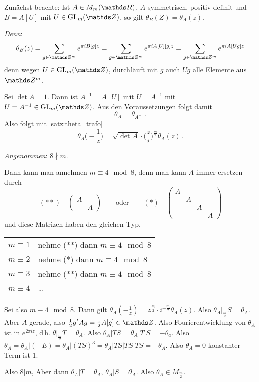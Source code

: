 \begin{bewe}
Zunächst beachte: Ist $A \in M_m(\RR)$, $A$ symmetrisch, positiv definit und $B = A[U]$ mit $U \in \GL_m(\ZZ)$, so gilt $\theta_B(Z) = \theta_A(z)$.

\emph{Denn}:
\[
    \theta_B(z)
    = \sum_{g \in \ZZ^m} e^{\pi iB[g]z}
    = \sum_{g \in \ZZ^m} e^{\pi i A[U][g]z}
    = \sum_{g \in \ZZ^m} e^{\pi i A[Ug]z}
\]
denn wegen $U\in\GL_m(\ZZ)$, durchläuft mit $g$ auch $Ug$ alle Elemente aus $\ZZ^m$.

Sei $\det A = 1$.
Dann ist $A^{-1} = A[U]$ mit $U = A^{-1}$ mit $U = A^{-1} \in \GL_m(\ZZ)$.
Aus den Voraussetzungen folgt damit
\[
    \theta_A = \theta_{A^{-1}}
    \,.
\]
Also folgt mit \autoref{satz:theta_trafo}
\[
    \theta_{A}\Big(-\frac{1}{z}\Big)
    = \sqrt{\det A} \cdot \Big(\frac{z}{i}\Big)^{\frac{m}{2}} \theta_A(z)
    \,.
\]

\emph{Angenommen}: $8 \nmid m$.

Dann kann man annehmen $m \equiv 4 \mod 8$, denn man kann $A$ immer ersetzen durch
\[
    (**)\quad \begin{pmatrix}A&\\&A\end{pmatrix} \qquad \text{oder} \qquad (*) \quad \begin{pmatrix}A\\&A\\&&A\\&&&A\end{pmatrix}
\]
und diese Matrizen haben den gleichen Typ.

\begin{tabular}{l l}
$m \equiv 1$ & nehme (**) dann $m \equiv 4 \mod 8$ \\
$m \equiv 2$ & nehme (*)\phantom{*} dann $m \equiv 4 \mod 8$ \\
$m \equiv 3$ & nehme (**) dann $m \equiv 4 \mod 8$ \\
$m \equiv 4$ & \ldots
\end{tabular}

Sei also $m \equiv 4 \mod 8$.
Dann gilt $\theta_A(-\frac{1}{z}) = z^{\frac{m}{2}} \cdot i^{-\frac{m}{2}} \theta_A(z)$.
Also $\theta_A|_{\frac{m}{2}}S = \theta_A$. Aber $A$ gerade, also $\frac{1}{2}g^tAg = \frac{1}{2}A[g] \in \ZZ$.
Also Fourierentwicklung von $\theta_A$ ist in $e^{2\pi iz}$, d\,h. $\theta|_{\frac{m}{2}}T = \theta_A$.
Also $\theta_A|TS = \theta_A|T|S = - \theta_a$.
Also $\theta_A = \theta_A|(-E) = \theta_A|(TS)^3 = \theta_A|TS|TS|TS = -\theta_A$.
Also $\theta_A = 0$ \blitz konstanter Term ist 1.

Also $8|m$, Aber dann $\theta_A|T = \theta_A$, $\theta_A|S = \theta_A$. Also $\theta_A \in M_{\frac{m}{2}}$.
\end{bewe}